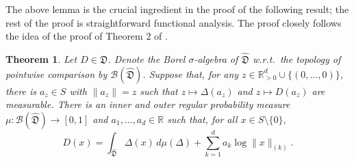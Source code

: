 \documentclass[12pt,a4paper,reqno]{amsart}
\newtheorem{theorem}[proposition]{Theorem}
\theoremstyle{definition}
\newcommand{\mc}[1]{\mathcal{#1}}
\newcommand{\mf}[1]{\mathfrak{#1}}
\newcommand{\R}{\mathbb R}
\begin{document}
The above lemma is the crucial ingredient in the proof of the following result; the rest of the proof is straightforward functional analysis. The proof closely follows the idea of the proof of Theorem 2 of \cite{Mu_et_al_2021}.

\begin{theorem}\label{thm:barycentre}
Let $D\in\mf D$. Denote the Borel $\sigma$-algebra of $\hat{\mf D}$ w.r.t.\ the topology of pointwise comparison by $\mc B(\hat{\mf D})$. Suppose that, for any $z\in\R_{>0}^d\cup\{(0,\ldots,0)\}$, there is $a_z\in S$ with $\|a_z\|=z$ such that $z\mapsto\Delta(a_z)$ and $z\mapsto D(a_z)$ are measurable. There is an inner and outer regular probability measure $\mu:\mc B(\hat{\mf D})\to[0,1]$ and $a_1,\ldots,a_d\in\R$ such that, for all $x\in S\setminus\{0\}$,
\begin{equation}\label{eq:barycentre}
D(x)=\int_{\hat{\mf D}} \Delta(x)\,d\mu(\Delta)+\sum_{k=1}^d a_k\log{\|x\|_{(k)}}.
\end{equation}
\end{theorem}
\end{document}
